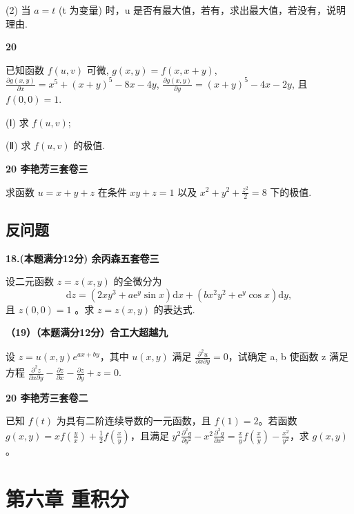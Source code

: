 \documentclass[a4paper,12pt]{article}
\begin{document}
(2) 当 $a = t$ (t 为变量) 时，u 是否有最大值，若有，求出最大值，若没有，说明理由.

\vspace{0.5cm}

\textbf{20}

已知函数 $ f(u, v) $ 可微, $ g(x, y) = f(x, x + y) $, $ \frac{\partial g(x, y)}{\partial x} = x^5 + (x + y)^5 - 8x - 4y $, $ \frac{\partial g(x, y)}{\partial y} = (x + y)^5 - 4x - 2y $, 且 $ f(0, 0) = 1 $.

(Ⅰ) 求 $f(u, v)$;

(Ⅱ) 求 $f(u,v)$ 的极值.

\vspace{0.5cm}

\textbf{20 李艳芳三套卷三}

求函数 $u = x + y + z$ 在条件 $xy + z = 1$ 以及 $x^2 + y^2 + \frac{z^2}{2} = 8$ 下的极值.

\subsection{反问题}

\textbf{18.(本题满分12分) 余丙森五套卷三}

设二元函数 $z = z(x, y)$ 的全微分为
\[ \mathrm{d}z=(2xy^{3}+a\mathrm{e}^{y}\sin x)\mathrm{d}x+(bx^{2}y^{2}+\mathrm{e}^{y}\cos x)\mathrm{d}y, \]
且 $z(0,0)=1$ 。求 $z=z(x,y)$ 的表达式.

\vspace{0.5cm}

\textbf{（19）（本题满分12分）合工大超越九}

设 $z = u(x, y) e^{ax + by}$，其中 $u(x, y)$ 满足 $\frac{\partial^{2}u}{\partial x \partial y} = 0$，试确定 a, b 使函数 z 满足方程 $\frac{\partial^{2}z}{\partial x \partial y} - \frac{\partial z}{\partial x} - \frac{\partial z}{\partial y} + z = 0.$

\vspace{0.5cm}

\textbf{20 李艳芳三套卷二}

已知 $f(t)$ 为具有二阶连续导数的一元函数，且 $f(1) = 2$。若函数 $g(x, y) = x f\left(\frac{y}{x}\right) + \frac{1}{2} f\left(\frac{x}{y}\right)$，且满足 $y^2 \frac{\partial^2 g}{\partial y^2} - x^2 \frac{\partial^2 g}{\partial x^2} = \frac{x}{y} f\left(\frac{x}{y}\right) - \frac{x^2}{y^2}$，求 $g(x, y)$。

\section{第六章 重积分}
\end{document}
